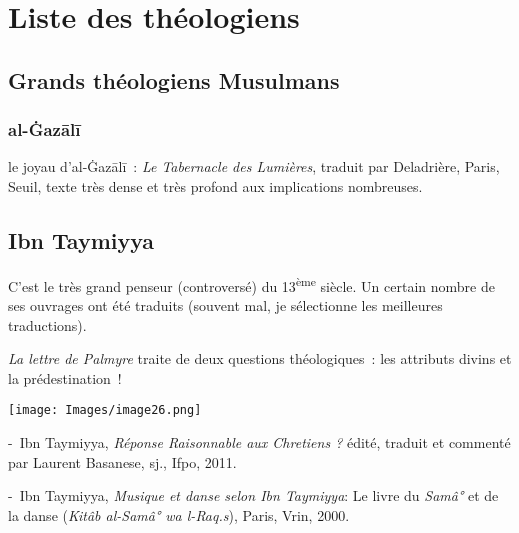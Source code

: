 \chapter{Liste des théologiens}

\section{Grands théologiens Musulmans}


\subsection{al-Ġazālī}

le joyau d'al-Ġazālī~: \emph{Le Tabernacle des Lumières}, traduit
par Deladrière, Paris, Seuil, texte très dense et très profond aux
implications nombreuses.
\pageref{theol:AlGazali29}
\pageref{theol:AlGazali2}
\pageref{theol:AlGazali3}
\pageref{theol:AlGazali8}
\pageref{theol:AlGazali25}
\section{Ibn Taymiyya}


 

C'est le très grand penseur (controversé) du 13\textsuperscript{ème}
siècle. Un certain nombre de ses ouvrages ont été traduits (souvent mal,
je sélectionne les meilleures traductions).


\emph{La lettre de Palmyre} traite de deux questions théologiques~: les
attributs divins et la prédestination~!

\texttt{[image: Images/image26.png]}

-~Ibn Taymiyya, \emph{Réponse Raisonnable aux Chretiens ?} édité,
traduit et commenté par Laurent Basanese, sj., Ifpo, 2011.

-~Ibn Taymiyya, \emph{Musique et danse selon Ibn Taymiyya}: Le livre du
\emph{Samâ°} et de la danse (\emph{Kitâb al-Samâ° wa l-Raq.s}), Paris,
Vrin, 2000.

